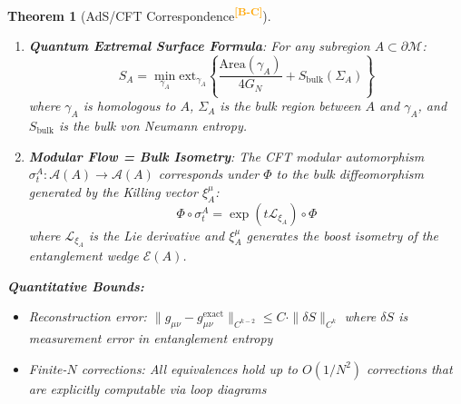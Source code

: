 \documentclass[12pt,a4paper]{article}
\newtheorem{theorem}{Theorem}[section]
\newcommand{\levelBC}{\textsuperscript{\textcolor{orange}{\textbf{[B-C]}}}}
\begin{document}
\begin{theorem}[AdS/CFT Correspondence\levelBC]
\begin{enumerate}[label=(\roman*)]
    \item \textbf{Quantum Extremal Surface Formula}: For any subregion $A \subset \partial\mathcal{M}$:
    \begin{equation}
    S_A = \min_{\gamma_A} \text{ext}_{\gamma_A}\left\{\frac{\text{Area}(\gamma_A)}{4G_N} + S_{\text{bulk}}(\Sigma_A)\right\}
    \end{equation}
    where $\gamma_A$ is homologous to $A$, $\Sigma_A$ is the bulk region between $A$ and $\gamma_A$, and $S_{\text{bulk}}$ is the bulk von Neumann entropy.
    
    \item \textbf{Modular Flow = Bulk Isometry}: The CFT modular automorphism $\sigma_t^A: \mathcal{A}(A) \to \mathcal{A}(A)$ corresponds under $\Phi$ to the bulk diffeomorphism generated by the Killing vector $\xi_A^\mu$:
    \begin{equation}
    \Phi \circ \sigma_t^A = \exp(t \mathcal{L}_{\xi_A}) \circ \Phi
    \end{equation}
    where $\mathcal{L}_{\xi_A}$ is the Lie derivative and $\xi_A^\mu$ generates the boost isometry of the entanglement wedge $\mathcal{E}(A)$.
\end{enumerate}

\textbf{Quantitative Bounds:}
\begin{itemize}
    \item Reconstruction error: $\|g_{\mu\nu} - g_{\mu\nu}^{\text{exact}}\|_{C^{k-2}} \leq C \cdot \|\delta S\|_{C^k}$ where $\delta S$ is measurement error in entanglement entropy
    \item Finite-$N$ corrections: All equivalences hold up to $O(1/N^2)$ corrections that are explicitly computable via loop diagrams
\end{itemize}
\end{theorem}
\end{document}
